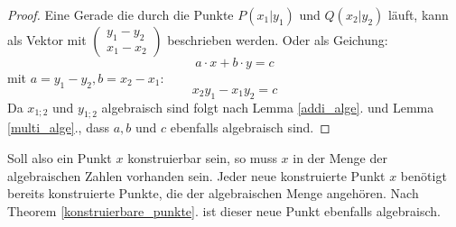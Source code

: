 \documentclass[11pt]{article}
\begin{document}
    \begin{proof}  
    Eine Gerade die durch die Punkte $P(x_1|y_1)$ und $Q(x_2|y_2)$ läuft, kann als Vektor mit $\begin{pmatrix}y_1-y_2 \\ x_1-x_2\end{pmatrix}$ beschrieben werden. Oder als Geichung: \[a\cdot x+b\cdot y =c\] mit $a=y_1-y_2, b=x_2-x_1$: \[x_2y_1-x_1y_2=c\] Da $x_{1;2}$ und $y_{1;2}$ algebraisch sind folgt nach Lemma \ref{addi_alge}. und Lemma \ref{multi_alge}., dass $a, b$ und $c$ ebenfalls algebraisch sind.\end{proof} Soll also ein Punkt $x$ konstruierbar sein, so muss $x$ in der Menge der algebraischen Zahlen vorhanden sein. Jeder neue konstruierte Punkt $x$ benötigt bereits konstruierte Punkte, die der algebraischen Menge angehören. Nach Theorem \ref{konstruierbare_punkte}. ist dieser neue Punkt ebenfalls algebraisch.
\end{document}
